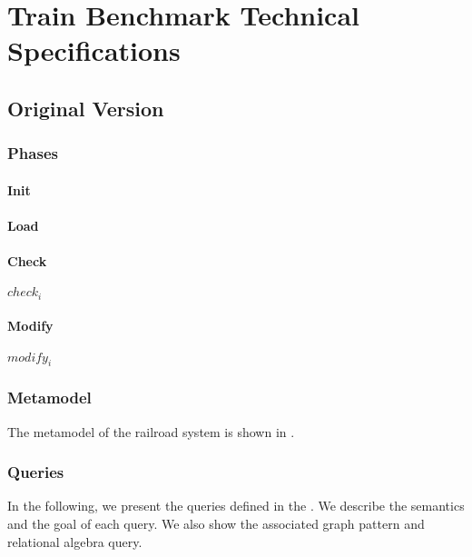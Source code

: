 \chapter{Train Benchmark Technical Specifications}

\section{Original Version}

\subsection{Phases}


\subsubsection{Init}

\subsubsection{Load}

\subsubsection{Check}

$\mathit{check}_i$

\subsubsection{Modify}

$\mathit{modify}_i$

\subsection{Metamodel}

The metamodel of the railroad system is shown in .

\subsection{Queries}


In the following, we present the queries defined in the \tb{}. We describe the semantics and the goal of each query. We also show the associated graph pattern and relational algebra query.

